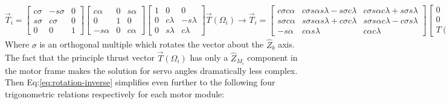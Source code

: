 \begin{subequations}
\begin{equation}
\vec{T}_i=\begin{bmatrix}
c\sigma & -s\sigma & 0\\
s\sigma & c\sigma & 0\\
0 & 0 & 1 
\end{bmatrix}
\begin{bmatrix}
c\alpha & 0 & s\alpha\\
0 & 1 & 0\\
-s\alpha & 0 & c\alpha
\end{bmatrix}
\begin{bmatrix}
1 & 0 & 0\\
0 & c\lambda & -s\lambda\\
0 & s\lambda & c\lambda
\end{bmatrix}\vec{T}(\Omega_i)
\end{equation}
\begin{equation}
\rightarrow\vec{T}_i=\begin{bmatrix}
c\sigma c\alpha & c\sigma s\alpha s\lambda - s\sigma c\lambda & c\sigma s\alpha c\lambda + s\sigma s\lambda\\
s\sigma c\alpha & s\sigma s\alpha s\lambda + c\sigma c\lambda & s\sigma s\alpha c\lambda - c\sigma s\lambda\\
-s\alpha & c\alpha s\lambda & c\alpha c\lambda
\end{bmatrix}
\begin{bmatrix}
0\\
0\\
T(\Omega_i)
\end{bmatrix}
\end{equation}
\begin{equation}\label{eq:rotation-inverse}
\rightarrow
\begin{bmatrix}
T_x\\
T_y\\
T_z
\end{bmatrix}
=\begin{bmatrix}
s\sigma s\lambda + c\sigma s\alpha c\lambda\\
s\sigma s\alpha c\lambda - c\sigma s\alpha\\
c\alpha c\lambda
\end{bmatrix}
T(\Omega_i)
\end{equation}
\end{subequations}
Where $\sigma$ is an orthogonal multiple which rotates the vector about the $\hat{Z}_b$ axis. The fact that the principle thrust vector $\vec{T}(\Omega_i)$ has only a $\hat{Z}_{M_i}$ component in the motor frame makes the solution for servo angles dramatically less complex. Then Eq:\ref{eq:rotation-inverse} simplifies even further to the following four trigonometric relations respectively for each motor module:

